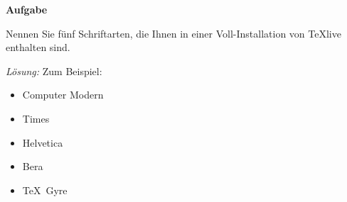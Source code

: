 \documentclass[DIV12,paper=A6,pagesize]{scrartcl}
\begin{document}
\LARGE

\begin{aufgabe}
\textbf{Aufgabe}

Nennen Sie fünf Schriftarten, die Ihnen in einer Voll-Installation von \TeX{}live enthalten sind.
\end{aufgabe}

\begin{loesung}
\bigskip

\textit{Lösung:} Zum Beispiel:
\begin{itemize}
\item Computer Modern
\item Times
\item Helvetica
\item Bera
\item \TeX\ Gyre
\end{itemize}

\end{loesung}
\end{document}

